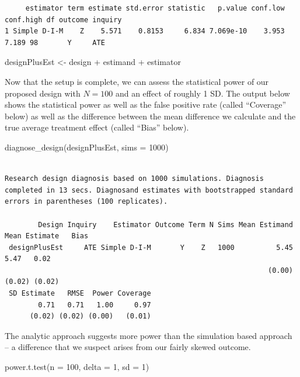 \documentclass[
  12pt,
]{book}
\newenvironment{Shaded}{\begin{snugshade}}{\end{snugshade}}
\newcommand{\AttributeTok}[1]{\textcolor[rgb]{0.77,0.63,0.00}{#1}}
\newcommand{\DecValTok}[1]{\textcolor[rgb]{0.00,0.00,0.81}{#1}}
\newcommand{\FunctionTok}[1]{\textcolor[rgb]{0.00,0.00,0.00}{#1}}
\newcommand{\NormalTok}[1]{#1}
\newcommand{\OtherTok}[1]{\textcolor[rgb]{0.56,0.35,0.01}{#1}}
\newcommand{\SpecialCharTok}[1]{\textcolor[rgb]{0.00,0.00,0.00}{#1}}
\theoremstyle{definition}
\theoremstyle{definition}
\theoremstyle{definition}
\theoremstyle{remark}
\begin{document}
\begin{verbatim}
     estimator term estimate std.error statistic   p.value conf.low conf.high df outcome inquiry
1 Simple D-I-M    Z    5.571    0.8153     6.834 7.069e-10    3.953     7.189 98       Y     ATE
\end{verbatim}

\begin{Shaded}
\begin{Highlighting}[]
\NormalTok{designPlusEst }\OtherTok{\textless{}{-}}\NormalTok{ design }\SpecialCharTok{+}\NormalTok{ estimand }\SpecialCharTok{+}\NormalTok{ estimator}
\end{Highlighting}
\end{Shaded}

Now that the setup is complete, we can assess the statistical power of
our proposed design with \(N=100\) and an effect of roughly 1 SD. The
output below shows the statistical power as well as the false positive
rate (called ``Coverage'' below) as well as the difference between the
mean difference we calculate and the true average treatment effect
(called ``Bias'' below).

\begin{Shaded}
\begin{Highlighting}[]
\FunctionTok{diagnose\_design}\NormalTok{(designPlusEst, }\AttributeTok{sims =} \DecValTok{1000}\NormalTok{)}
\end{Highlighting}
\end{Shaded}

\begin{verbatim}

Research design diagnosis based on 1000 simulations. Diagnosis completed in 13 secs. Diagnosand estimates with bootstrapped standard errors in parentheses (100 replicates).

        Design Inquiry    Estimator Outcome Term N Sims Mean Estimand Mean Estimate   Bias
 designPlusEst     ATE Simple D-I-M       Y    Z   1000          5.45          5.47   0.02
                                                               (0.00)        (0.02) (0.02)
 SD Estimate   RMSE  Power Coverage
        0.71   0.71   1.00     0.97
      (0.02) (0.02) (0.00)   (0.01)
\end{verbatim}

The analytic approach suggests more power than the simulation based
approach -- a difference that we suspect arises from our fairly skewed
outcome.

\begin{Shaded}
\begin{Highlighting}[]
\FunctionTok{power.t.test}\NormalTok{(}\AttributeTok{n =} \DecValTok{100}\NormalTok{, }\AttributeTok{delta =} \DecValTok{1}\NormalTok{, }\AttributeTok{sd =} \DecValTok{1}\NormalTok{)}
\end{Highlighting}
\end{Shaded}
\end{document}
